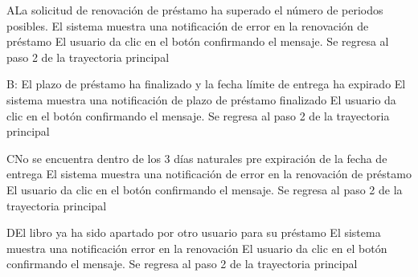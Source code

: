 		\begin{UCtrayectoriaA}{A}{La solicitud de renovación de préstamo ha superado el número de periodos posibles.}
			\UCpaso[\UCsist]El sistema muestra una notificación de error en la renovación de préstamo 
			\UCpaso[\UCactor] El usuario da clic en el botón  confirmando el mensaje. 
			\UCpaso[\UCsist] Se regresa al paso 2 de la trayectoria principal 
		\end{UCtrayectoriaA}

		\begin{UCtrayectoriaA}{B}{: El plazo de préstamo ha finalizado y la fecha límite de entrega ha expirado}
			\UCpaso[\UCsist]El sistema muestra una notificación de plazo de préstamo finalizado 
			\UCpaso[\UCactor] El usuario da clic en el botón  confirmando el mensaje. 
			\UCpaso[\UCsist] Se regresa al paso 2 de la trayectoria principal 
		\end{UCtrayectoriaA}
		
				\begin{UCtrayectoriaA}{C}{No se encuentra dentro de los 3 días naturales pre expiración de la fecha de entrega}
			\UCpaso[\UCsist]El sistema muestra una notificación de error en la renovación de préstamo 
			\UCpaso[\UCactor] El usuario da clic en el botón  confirmando el mensaje. 
			\UCpaso[\UCsist] Se regresa al paso 2 de la trayectoria principal 
		\end{UCtrayectoriaA}
		
				\begin{UCtrayectoriaA}{D}{El libro ya ha sido apartado por otro usuario para su préstamo }
			\UCpaso[\UCsist]El sistema muestra una notificación error en la renovación  
			\UCpaso[\UCactor] El usuario da clic en el botón  confirmando el mensaje. 
			\UCpaso[\UCsist] Se regresa al paso 2 de la trayectoria principal 
		\end{UCtrayectoriaA}

